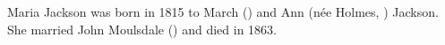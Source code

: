 
Maria Jackson was born in 1815 to March () and Ann (n\'{e}e Holmes, ) Jackson. She married John Moulsdale () and died in 1863.
